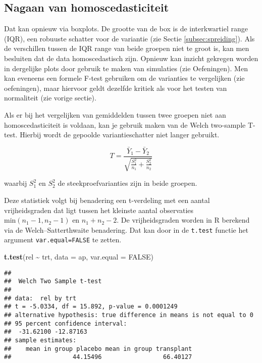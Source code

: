 \documentclass[
  12pt,dutch,coursenotes]{book}
\newenvironment{Shaded}{\begin{snugshade}}{\end{snugshade}}
\newcommand{\DataTypeTok}[1]{\textcolor[rgb]{0.13,0.29,0.53}{#1}}
\newcommand{\KeywordTok}[1]{\textcolor[rgb]{0.13,0.29,0.53}{\textbf{#1}}}
\newcommand{\NormalTok}[1]{#1}
\newcommand{\OperatorTok}[1]{\textcolor[rgb]{0.81,0.36,0.00}{\textbf{#1}}}
\newcommand{\OtherTok}[1]{\textcolor[rgb]{0.56,0.35,0.01}{#1}}
\newcommand{\StringTok}[1]{\textcolor[rgb]{0.31,0.60,0.02}{#1}}
\theoremstyle{definition}
\theoremstyle{definition}
\theoremstyle{definition}
\theoremstyle{remark}
\begin{document}
\hypertarget{nagaan-van-homoscedasticiteit}{%
\subsection{Nagaan van homoscedasticiteit}\label{nagaan-van-homoscedasticiteit}}

Dat kan opnieuw via boxplots.
De grootte van de box is de interkwartiel range (IQR), een robuuste schatter voor de variantie (zie Sectie \ref{subsec:spreiding}).
Als de verschillen tussen de IQR range van beide groepen niet te groot is, kan men besluiten dat de data homoscedastisch zijn.
Opnieuw kan inzicht gekregen worden in dergelijke plots door gebruik te maken van simulaties (zie Oefeningen).
Men kan eveneens een formele F-test gebruiken om de varianties te vergelijken (zie oefeningen), maar hiervoor geldt dezelfde kritiek als voor het testen van normaliteit (zie vorige sectie).

Als er bij het vergelijken van gemiddelden tussen twee groepen niet aan homoscedasticiteit is voldaan, kan je gebruik maken van de Welch two-sample T-test.
Hierbij wordt de gepoolde variantieschatter niet langer gebruikt.

\[T =  \frac{\bar{Y}_1 - \bar{Y}_2}{\sqrt{\frac{S^2_1}{n_1}+\frac{S^2_2}{n_2}}}\]

waarbij \(S^2_1\) en \(S^2_2\) de steekproefvarianties zijn in beide groepen.

Deze statistiek volgt bij benadering een t-verdeling met een aantal vrijheidsgraden dat ligt tussen het kleinste aantal observaties \(\text{min}(n_1-1,n_2-1)\) en \(n_1+n_2-2\).
De vrijheidsgraden worden in R berekend via de Welch--Satterthwaite benadering.
Dat kan door in de \texttt{t.test} functie het argument \texttt{var.equal=FALSE} te zetten.

\begin{Shaded}
\begin{Highlighting}[]
\KeywordTok{t.test}\NormalTok{(rel }\OperatorTok{\textasciitilde{}}\StringTok{ }\NormalTok{trt, }\DataTypeTok{data =}\NormalTok{ ap, }\DataTypeTok{var.equal =} \OtherTok{FALSE}\NormalTok{)}
\end{Highlighting}
\end{Shaded}

\begin{verbatim}
## 
##  Welch Two Sample t-test
## 
## data:  rel by trt
## t = -5.0334, df = 15.892, p-value = 0.0001249
## alternative hypothesis: true difference in means is not equal to 0
## 95 percent confidence interval:
##  -31.62100 -12.87163
## sample estimates:
##    mean in group placebo mean in group transplant 
##                 44.15496                 66.40127
\end{verbatim}
\end{document}
